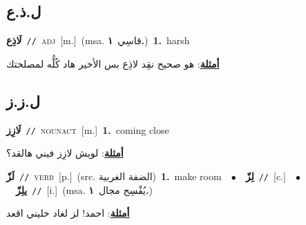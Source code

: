 \documentclass[10pt,a4paper,twoside]{article} %
\begin{document}
\begin{multicols}{2}
\vspace{-3mm}
\subsection*{\color{blue}\foreignlanguage{arabic}{ل.ذ.ع}\color{blue}{}} 

{\setlength\topsep{0pt}\textbf{\foreignlanguage{arabic}{لَاذِع}}\ {\color{gray}\texttt{//}\color{black}}\ \textsc{adj}\ [m.]\ \color{gray}(msa. \foreignlanguage{arabic}{قاسِي}~\foreignlanguage{arabic}{\textbf{١.}})\color{black}\ \textbf{1.}~harsh\  \begin{flushright}\color{gray}\foreignlanguage{arabic}{\textbf{\underline{\foreignlanguage{arabic}{أمثلة}}}: هو صحيح نقِد لاذِع بس الأخير هاد كُلُّه لمصلحتك}\end{flushright}\color{black}} \vspace{2mm}

\vspace{-3mm}
\subsection*{\color{blue}\foreignlanguage{arabic}{ل.ز.ز}\color{blue}{}} 

{\setlength\topsep{0pt}\textbf{\foreignlanguage{arabic}{لَازِز}}\ {\color{gray}\texttt{//}\color{black}}\ \textsc{noun\textunderscore act}\ [m.]\ \textbf{1.}~coming close\  \begin{flushright}\color{gray}\foreignlanguage{arabic}{\textbf{\underline{\foreignlanguage{arabic}{أمثلة}}}: لويش لازِز فيني هالقد؟}\end{flushright}\color{black}} \vspace{2mm}

{\setlength\topsep{0pt}\textbf{\foreignlanguage{arabic}{لَزّ}}\ {\color{gray}\texttt{//}\color{black}}\ \textsc{verb}\ [p.]\ (src. \color{gray}\foreignlanguage{arabic}{الضفة الغربية}\color{black})\ \textbf{1.}~make room\ \ $\bullet$\ \ \setlength\topsep{0pt}\textbf{\foreignlanguage{arabic}{لِزّ}}\ {\color{gray}\texttt{//}\color{black}}\ [c.]\ \ $\bullet$\ \ \setlength\topsep{0pt}\textbf{\foreignlanguage{arabic}{يلِزّ}}\ {\color{gray}\texttt{//}\color{black}}\ [i.]\ \color{gray}(msa. \foreignlanguage{arabic}{يُفْسِح مجال}~\foreignlanguage{arabic}{\textbf{١.}})\color{black}\  \begin{flushright}\color{gray}\foreignlanguage{arabic}{\textbf{\underline{\foreignlanguage{arabic}{أمثلة}}}: احمد! لز لغاد خليني اقعد}\end{flushright}\color{black}} \vspace{2mm}


\end{multicols}
\end{document}
